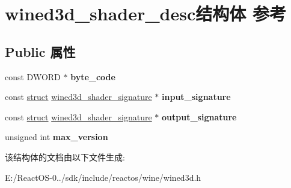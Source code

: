 \hypertarget{structwined3d__shader__desc}{}\section{wined3d\+\_\+shader\+\_\+desc结构体 参考}
\label{structwined3d__shader__desc}
\subsection*{Public 属性}
\begin{DoxyCompactItemize}
\item 
\mbox{\label{structwined3d__shader__desc_a4da745b506e32b8cb1b859c5a5d2139c}} 
const D\+W\+O\+RD $\ast$ {\bfseries byte\+\_\+code}
\item 
\mbox{\label{structwined3d__shader__desc_a4876999fa00e3cb5dec6bec75cf76579}} 
const \hyperlink{interfacestruct}{struct} \hyperlink{structwined3d__shader__signature}{wined3d\+\_\+shader\+\_\+signature} $\ast$ {\bfseries input\+\_\+signature}
\item 
\mbox{\label{structwined3d__shader__desc_a8b25cb53a6313be950bf13acbce72af1}} 
const \hyperlink{interfacestruct}{struct} \hyperlink{structwined3d__shader__signature}{wined3d\+\_\+shader\+\_\+signature} $\ast$ {\bfseries output\+\_\+signature}
\item 
\mbox{\label{structwined3d__shader__desc_ac82b19b9793de78e1e51459d1e384a61}} 
unsigned int {\bfseries max\+\_\+version}
\end{DoxyCompactItemize}


该结构体的文档由以下文件生成\+:\begin{DoxyCompactItemize}
\item 
E\+:/\+React\+O\+S-\/0../sdk/include/reactos/wine/wined3d.\+h\end{DoxyCompactItemize}
